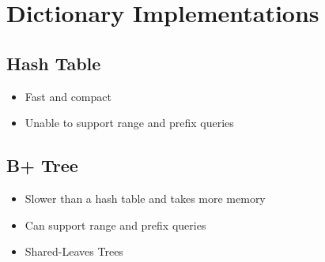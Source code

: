 \documentclass[11pt]{article}
\begin{document}
\section{Dictionary Implementations}
    \subsection*{Hash Table}
    \begin{itemize}
        \item Fast and compact
        \item Unable to support range and prefix queries
    \end{itemize}
    \subsection*{B+ Tree}
    \begin{itemize}
        \item Slower than a hash table and takes more memory
        \item Can support range and prefix queries
        \item Shared-Leaves Trees ~\cite{p283-binnig}
    \end{itemize}


\newpage


\end{document}
